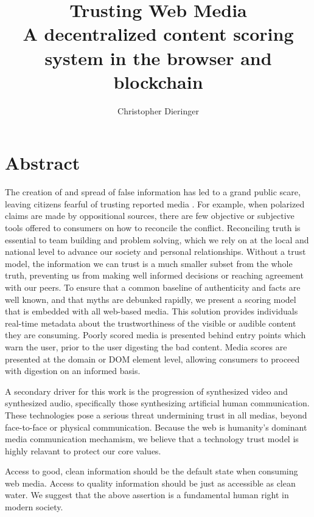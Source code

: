 \documentclass{paper}
\begin{document}
\title{%
Trusting Web Media \\
\large A decentralized content scoring system in the browser and blockchain}

\author{Christopher Dieringer}

\maketitle
\newpage

\section{Abstract}
The creation of and spread of false information has led to
a grand public scare, leaving citizens fearful of trusting
reported media \cite{manjoo2016}.  For example, when polarized claims are made by oppositional
sources, there are few objective or subjective tools offered to consumers
on how to reconcile the conflict.  Reconciling truth is essential to
team building and problem solving, which we rely on at the local and national
level to advance our society and personal relationships.  Without a trust model, the
information we can trust is a much smaller subset from the whole truth,
preventing us from making well informed decisions or reaching agreement with
our peers.  To ensure that a common baseline of authenticity and facts are well known,
and that myths are debunked rapidly, we present a scoring model that is embedded with
all web-based media.  This solution provides individuals real-time metadata about the
trustworthiness of the visible or audible content they are consuming.  Poorly scored media is
presented behind entry points which warn the user, prior to the user digesting the bad content.
Media scores are presented at the domain or DOM element level,
allowing consumers to proceed with digestion on an informed basis.

A secondary driver for this work is the progression of synthesized video and
synthesized audio, specifically those synthesizing artificial human communication.
These technologies pose a
serious threat undermining trust in all medias, beyond face-to-face or physical
communication.  Because the web is humanity's dominant media communication
mechamism, we believe that a technology trust model is highly relavant
to protect our core values.

Access to good, clean information should be the default state when consuming web media.  Access to quality information should be just as accessible
as clean water. We suggest that the above assertion is a fundamental human right
in modern society.
\end{document}
